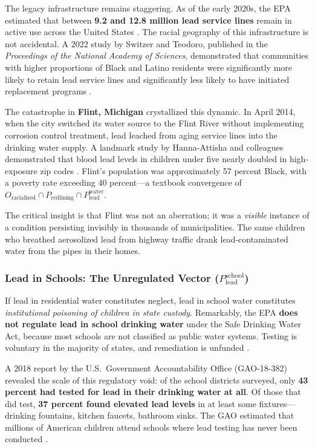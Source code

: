 \documentclass[12pt,openany]{book}
\begin{document}
The legacy infrastructure remains staggering. As of the early 2020s, the EPA estimated that between \textbf{9.2 and 12.8 million lead service lines} remain in active use across the United States \cite{tel_lsl}. The racial geography of this infrastructure is not accidental. A 2022 study by Switzer and Teodoro, published in the \textit{Proceedings of the National Academy of Sciences}, demonstrated that communities with higher proportions of Black and Latino residents were significantly more likely to retain lead service lines and significantly less likely to have initiated replacement programs \cite{tel_switzer}.

The catastrophe in \textbf{Flint, Michigan} crystallized this dynamic. In April 2014, when the city switched its water source to the Flint River without implementing corrosion control treatment, lead leached from aging service lines into the drinking water supply. A landmark study by Hanna-Attisha and colleagues demonstrated that blood lead levels in children under five nearly doubled in high-exposure zip codes \cite{tel_flint}. Flint's population was approximately 57 percent Black, with a poverty rate exceeding 40 percent---a textbook convergence of $O_{\text{racialized}} \cap P_{\text{redlining}} \cap P_{\text{lead}}^{\text{water}}$.

The critical insight is that Flint was not an aberration; it was a \textit{visible} instance of a condition persisting invisibly in thousands of municipalities. The same children who breathed aerosolized lead from highway traffic drank lead-contaminated water from the pipes in their homes.

\subsubsection{Lead in Schools: The Unregulated Vector (\texorpdfstring{$P_{\text{lead}}^{\text{school}}$}{P\_lead\^school})}

If lead in residential water constitutes neglect, lead in school water constitutes \textit{institutional poisoning of children in state custody}. Remarkably, the EPA \textbf{does not regulate lead in school drinking water} under the Safe Drinking Water Act, because most schools are not classified as public water systems. Testing is voluntary in the majority of states, and remediation is unfunded \cite{tel_gao}.

A 2018 report by the U.S.\ Government Accountability Office (GAO-18-382) revealed the scale of this regulatory void: of the school districts surveyed, only \textbf{43 percent had tested for lead in their drinking water at all}. Of those that did test, \textbf{37 percent found elevated lead levels} in at least some fixtures---drinking fountains, kitchen faucets, bathroom sinks. The GAO estimated that millions of American children attend schools where lead testing has never been conducted \cite{tel_gao}.
\end{document}
